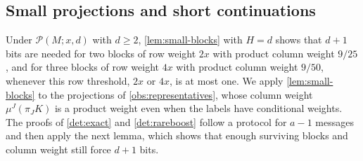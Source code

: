 \documentclass[11pt,letterpaper]{article} \usepackage[utf8]{inputenc}
\theoremstyle{plain} \newtheorem{theorem}{Theorem}[section]
\theoremstyle{definition} \newaliascnt{definition}{theorem}
\newcommand{\RP}[3]{\mathcal{P}(#1;#2,#3)}
\begin{document}
\subsection{Small projections and short continuations}
\label{sec:surviving-block-proofs}

Under $\RP{M}{x}{d}$ with $d\ge2$, \cref{lem:small-blocks} with $H=d$ shows that
$d+1$ bits are needed for two blocks of row weight $2x$ with product column
weight $9/25$, and for three blocks of row weight $4x$ with product column
weight $9/50$, whenever this row threshold, $2x$ or $4x$, is at most one. We apply
\cref{lem:small-blocks} to the projections of \cref{obs:representatives}, whose
column weight $\mu^J(\pi_JK)$ is a product weight even when the labels have conditional weights. The proofs of \cref{det:exact} and
\cref{det:rareboost} follow a protocol for $a-1$ messages and then apply the next
lemma, which shows that enough surviving blocks and column weight still force
$d+1$ bits.
\end{document}
